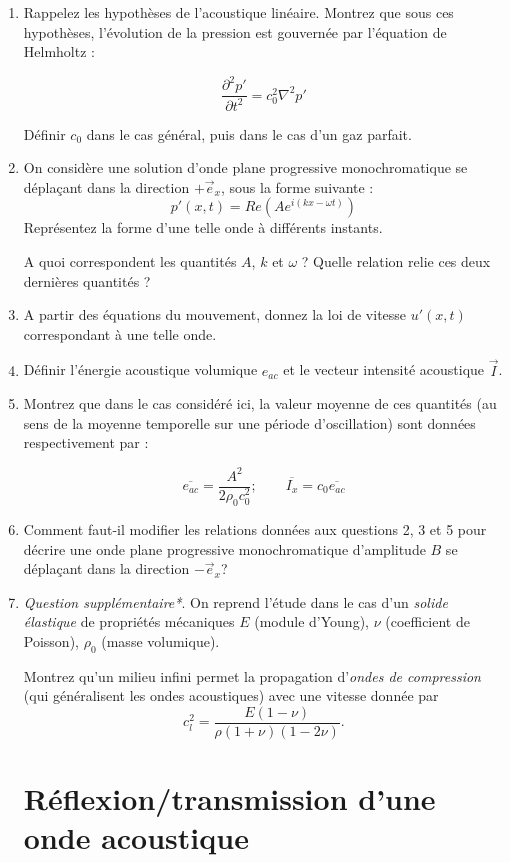 \documentclass[10pt, a4paper]{article}
\begin{document}
\begin{enumerate}
\item Rappelez les hypothèses de l'acoustique linéaire. Montrez que sous ces hypothèses, l'évolution de la pression est gouvernée par l'équation de Helmholtz :

$$
\frac{\partial^2 p'}{\partial t^2} = c_0^2 \nabla^2 p'
$$

Définir $c_0$ dans le cas général, puis dans le cas d'un gaz parfait.

\item On considère une solution d'onde plane progressive monochromatique se déplaçant dans la direction $+\vec{e}_x$, sous la  forme suivante :
$$
p'(x,t) = Re (A e^{i (k x - \omega t)})
$$
Représentez la forme d'une telle onde à différents instants. 

A quoi correspondent les quantités $A$, $k$ et $\omega$ ? Quelle relation relie ces deux dernières quantités ?

\item A partir des équations du mouvement, donnez la loi de vitesse $u'(x,t)$ correspondant à une telle onde.

\item Définir l'énergie acoustique volumique $e_{ac}$ et le vecteur intensité acoustique $\vec{I}$. 

\item Montrez que dans le cas considéré ici, la valeur moyenne de ces quantités (au sens de la moyenne temporelle sur une période d'oscillation) sont données respectivement par :
 
$$
\overline{e_{ac}} = \frac{A^2}{2 \rho_0 c_0 ^2} ; \qquad \overline{I_x} = c_0  \overline{e_{ac}} 
$$

\item Comment faut-il modifier les relations données aux questions 2, 3 et 5 pour décrire une onde plane progressive monochromatique d'amplitude $B$ se déplaçant dans la direction $-\vec{e}_x$? 


\item {\em Question supplémentaire*}.
On reprend l'étude dans le cas d'un {\em solide élastique} de propriétés mécaniques $E$ (module d'Young), $\nu$ (coefficient de Poisson), $\rho_0$ (masse volumique).

Montrez qu'un milieu infini permet la propagation d'{\em ondes de compression} (qui généralisent les ondes acoustiques) avec une vitesse donnée par 
$$
c_l^2 = \frac{E(1-\nu)}{\rho (1+\nu)(1- 2 \nu)}.
$$


\section{Réflexion/transmission d'une onde acoustique}




\end{enumerate}
\end{document}
